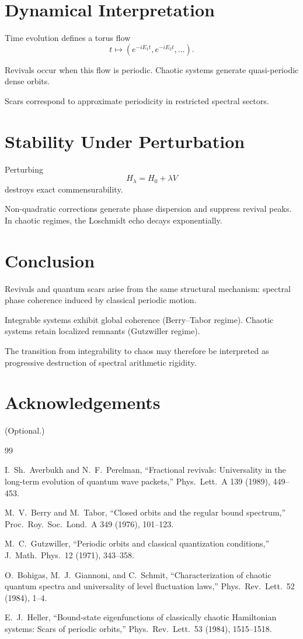 \documentclass[11pt]{article}
\begin{document}
\section{Dynamical Interpretation}

Time evolution defines a torus flow
\[
t \mapsto (e^{-iE_1 t}, e^{-iE_2 t},\dots).
\]

Revivals occur when this flow is periodic.
Chaotic systems generate quasi-periodic dense orbits.

Scars correspond to approximate periodicity in restricted spectral sectors.

\section{Stability Under Perturbation}

Perturbing
\[
H_\lambda = H_0 + \lambda V
\]
destroys exact commensurability.

Non-quadratic corrections generate phase dispersion
and suppress revival peaks.
In chaotic regimes, the Loschmidt echo decays exponentially.

\section{Conclusion}

Revivals and quantum scars arise from the same structural mechanism:
spectral phase coherence induced by classical periodic motion.

Integrable systems exhibit global coherence (Berry--Tabor regime).
Chaotic systems retain localized remnants (Gutzwiller regime).

The transition from integrability to chaos may therefore be interpreted
as progressive destruction of spectral arithmetic rigidity.

\section*{Acknowledgements}
(Optional.)

\begin{thebibliography}{99}

I.~Sh.~Averbukh and N.~F.~Perelman,
``Fractional revivals: Universality in the long-term evolution of quantum wave packets,''
Phys.\ Lett.\ A 139 (1989), 449–453.

M.~V.~Berry and M.~Tabor,
``Closed orbits and the regular bound spectrum,''
Proc.\ Roy.\ Soc.\ Lond.\ A 349 (1976), 101–123.

M.~C.~Gutzwiller,
``Periodic orbits and classical quantization conditions,''
J.\ Math.\ Phys.\ 12 (1971), 343–358.

O.~Bohigas, M.~J.~Giannoni, and C.~Schmit,
``Characterization of chaotic quantum spectra and universality of level fluctuation laws,''
Phys.\ Rev.\ Lett.\ 52 (1984), 1–4.

E.~J.~Heller,
``Bound-state eigenfunctions of classically chaotic Hamiltonian systems: Scars of periodic orbits,''
Phys.\ Rev.\ Lett.\ 53 (1984), 1515–1518.

\end{thebibliography}
\end{document}
